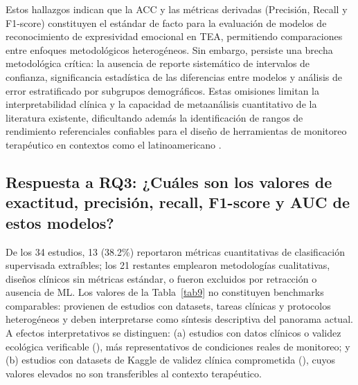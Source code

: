 \documentclass[3p,twocolumn,times]{elsarticle}
\begin{document}
	Estos hallazgos indican que la ACC y las métricas derivadas (Precisión, Recall y
	F1-score) constituyen el estándar de facto para la evaluación de modelos de
	reconocimiento de expresividad emocional en TEA, permitiendo comparaciones entre
	enfoques metodológicos heterogéneos. Sin embargo, persiste una brecha metodológica
	crítica: la ausencia de reporte sistemático de intervalos de confianza, significancia
	estadística de las diferencias entre modelos y análisis de error estratificado por
	subgrupos demográficos. Estas omisiones limitan la interpretabilidad clínica y la
	capacidad de metaanálisis cuantitativo de la literatura existente, dificultando
	además la identificación de rangos de rendimiento referenciales confiables para el
	diseño de herramientas de monitoreo terapéutico en contextos como el latinoamericano
	\cite{Radocaj2025,Hosney2024}.
	
	\subsection{Respuesta a RQ3: ¿Cuáles son los valores de exactitud, precisión,
		recall, F1-score y AUC de estos modelos?}\label{sec4c}
	
	De los 34 estudios, 13 (38.2\%) reportaron métricas cuantitativas de clasificación
	supervisada extraíbles; los 21 restantes emplearon metodologías cualitativas,
	diseños clínicos sin métricas estándar, o fueron excluidos por retracción o
	ausencia de ML. Los valores de la Tabla~\ref{tab9} no constituyen benchmarks
	comparables: provienen de estudios con datasets, tareas clínicas y protocolos
	heterogéneos y deben interpretarse como síntesis descriptiva del panorama actual.
	A efectos interpretativos se distinguen: (a) estudios con datos clínicos o validez
	ecológica verificable
	(\cite{Johnson2025,Radocaj2025,Washington2022,Sariyanidi2025,Hassan2025,Rudovic2019,Hwang2024}),
	más representativos de condiciones reales de monitoreo; y (b) estudios con datasets
	de Kaggle de validez clínica comprometida (\cite{Aljbori2025,Ramachandran2025,Hosney2024}),
	cuyos valores elevados no son transferibles al contexto terapéutico.
	
\end{document}
